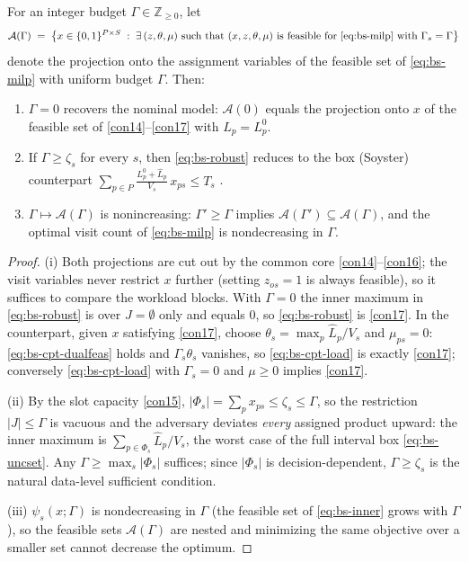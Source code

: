 \begin{proposition}
\label{prop:bs-limits}
For an integer budget $\Gamma \in \mathbb Z_{\ge 0}$, let
\[
\mathcal A(\Gamma) \;=\; \bigl\{ x \in \{0,1\}^{P \times S} \;:\;
\exists\, (z, \theta, \mu) \text{ such that } (x, z, \theta, \mu)
\text{ is feasible for \eqref{eq:bs-milp} with } \Gamma_s = \Gamma \bigr\}
\]
denote the projection onto the assignment variables of the feasible set of
\eqref{eq:bs-milp} with uniform budget $\Gamma$. Then:
\begin{enumerate}
\item[(i)] $\Gamma = 0$ recovers the nominal model: $\mathcal A(0)$ equals
the projection onto $x$ of the feasible set of \eqref{con14}--\eqref{con17}
with $L_p = L^0_p$.
\item[(ii)] If $\Gamma \ge \zeta_s$ for every $s$, then \eqref{eq:bs-robust}
reduces to the box (Soyster) counterpart
$\sum_{p \in P} \frac{L^0_p + \hat L_p}{V_s}\, x_{ps} \le T_s$
\citep{soyster1973convex}.
\item[(iii)] $\Gamma \mapsto \mathcal A(\Gamma)$ is nonincreasing:
$\Gamma' \ge \Gamma$ implies $\mathcal A(\Gamma') \subseteq \mathcal A(\Gamma)$,
and the optimal visit count of \eqref{eq:bs-milp} is nondecreasing in $\Gamma$.
\end{enumerate}
\end{proposition}

\begin{proof}
(i) Both projections are cut out by the common core
\eqref{con14}--\eqref{con16}; the visit variables never restrict $x$ further
(setting $z_{os} = 1$ is always feasible), so it suffices to compare the
workload blocks. With $\Gamma = 0$ the inner maximum in \eqref{eq:bs-robust}
is over $J = \emptyset$ only and equals $0$, so \eqref{eq:bs-robust} is
\eqref{con17}. In the counterpart, given $x$ satisfying \eqref{con17}, choose
$\theta_s = \max_p \hat L_p / V_s$ and $\mu_{ps} = 0$:
\eqref{eq:bs-cpt-dualfeas} holds and $\Gamma_s \theta_s$ vanishes, so
\eqref{eq:bs-cpt-load} is exactly \eqref{con17}; conversely
\eqref{eq:bs-cpt-load} with $\Gamma_s = 0$ and $\mu \ge 0$ implies
\eqref{con17}.

(ii) By the slot capacity \eqref{con15}, $|\Phi_s| = \sum_p x_{ps} \le
\zeta_s \le \Gamma$, so the restriction $|J| \le \Gamma$ is vacuous and the
adversary deviates \emph{every} assigned product upward: the inner maximum is
$\sum_{p \in \Phi_s} \hat L_p / V_s$, the worst case of the full interval box
\eqref{eq:bs-uncset}. Any $\Gamma \ge \max_s |\Phi_s|$ suffices; since
$|\Phi_s|$ is decision-dependent, $\Gamma \ge \zeta_s$ is the natural
data-level sufficient condition.

(iii) $\psi_s(x;\Gamma)$ is nondecreasing in $\Gamma$ (the feasible set of
\eqref{eq:bs-inner} grows with $\Gamma$), so the feasible sets
$\mathcal A(\Gamma)$ are nested and minimizing the same objective over a
smaller set cannot decrease the optimum.
\end{proof}

